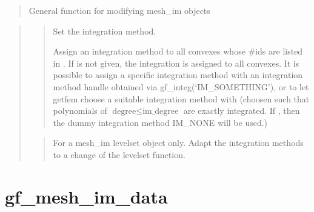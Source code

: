\documentclass[a4paper,11pt,english]{sphinxmanual}
\begin{document}
\sphinxAtStartPar
{}
\begin{quote}

\sphinxAtStartPar
General function for modifying mesh\_im objects
\end{quote}

\sphinxAtStartPar
{}
\begin{quote}

\sphinxAtStartPar
{}
\begin{quote}

\sphinxAtStartPar
Set the integration method.

\sphinxAtStartPar
Assign an integration method to all convexes whose \#ids are
listed in . If  is not given, the integration is
assigned to all convexes. It is possible to assign a specific
integration method with an integration method handle  obtained
via gf\_integ(‘IM\_SOMETHING’), or to let getfem choose a suitable
integration method with  (choosen such that polynomials
of \(\text{degree} \leq \text{im\_degree}\) are exactly integrated.
If , then the dummy integration method IM\_NONE will
be used.)
\end{quote}

\sphinxAtStartPar
{}
\begin{quote}

\sphinxAtStartPar
For a mesh\_im levelset object only. Adapt the integration methods to a
change of the levelset function.
\end{quote}
\end{quote}


\section{gf\_mesh\_im\_data}
\label{\detokenize{matlab_octave/cmdref_gf_mesh_im_data:gf-mesh-im-data}}\label{\detokenize{matlab_octave/cmdref_gf_mesh_im_data::doc}}
\sphinxAtStartPar
{}

\begin{sphinxVerbatim}[commandchars=\\\{\}]
       
\end{sphinxVerbatim}
\end{document}
